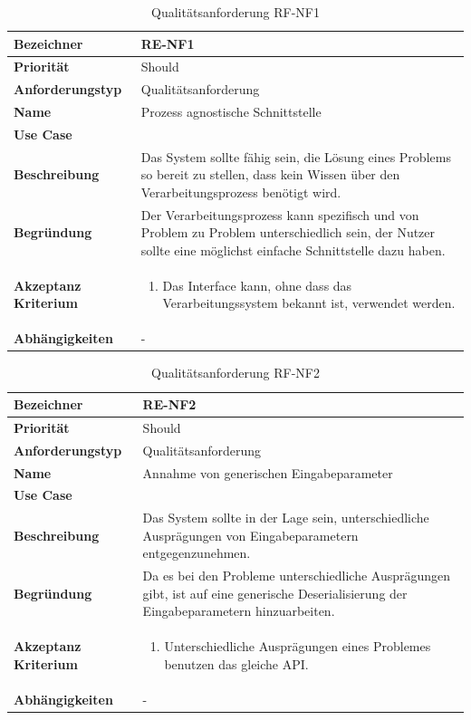 \begin{table}[ht]
\centering
  \begin{tabular}{ l | p{8cm} }
	\hline
	\rowcolor{gray}
	\textbf{Bezeichner}&	\textbf{RE-NF1}\\ \hline
	\textbf{Priorität} 		&	Should\\ \hline
	\textbf{Anforderungstyp}	&	Qualitätsanforderung\\ \hline
	\textbf{Name} 			&	Prozess agnostische Schnittstelle\\ \hline
	\textbf{Use Case} 		&	\nameref{table:use_case_1}\\ \hline
	\textbf{Beschreibung} 	&	Das System sollte fähig sein, die Lösung eines Problems so bereit zu stellen, dass kein Wissen über den Verarbeitungsprozess benötigt wird.\\ \hline
	\textbf{Begründung} 		&	Der Verarbeitungsprozess kann spezifisch und von Problem zu Problem unterschiedlich sein, der Nutzer sollte eine möglichst einfache 
							Schnittstelle dazu haben.\\ \hline
	\textbf{Akzeptanz Kriterium}	&	\begin{enumerate}
					\item Das Interface kann, ohne dass das Verarbeitungssystem bekannt ist, verwendet werden.
					\end{enumerate}
					\\ \hline
	\textbf{Abhängigkeiten} 	&	-\\ \hline
  \end{tabular}
   \caption{Qualitätsanforderung RF-NF1}\label{table:req_nf_1}
\end{table}

\begin{table}[ht]
\centering
  \begin{tabular}{ l | p{8cm} }
	\hline
	\rowcolor{gray}
	\textbf{Bezeichner}&	\textbf{RE-NF2}\\ \hline
	\textbf{Priorität} 		&	Should\\ \hline
	\textbf{Anforderungstyp}	&	Qualitätsanforderung\\ \hline
	\textbf{Name} 			&	Annahme von generischen Eingabeparameter\\ \hline
	\textbf{Use Case} 		&	\nameref{table:use_case_1}\\ \hline
	\textbf{Beschreibung} 	&	Das System sollte in der Lage sein, unterschiedliche Ausprägungen von Eingabeparametern entgegenzunehmen.\\ \hline
	\textbf{Begründung} 		&	Da es bei den Probleme unterschiedliche Ausprägungen gibt, ist auf eine generische Deserialisierung der Eingabeparametern hinzuarbeiten.\\ \hline
	\textbf{Akzeptanz Kriterium}	&	\begin{enumerate}
					\item Unterschiedliche Ausprägungen eines Problemes benutzen das gleiche API.
					\end{enumerate}
					\\ \hline
	\textbf{Abhängigkeiten} 	&	-\\ \hline
  \end{tabular}
   \caption{Qualitätsanforderung RF-NF2}\label{table:req_nf_2}
\end{table}

